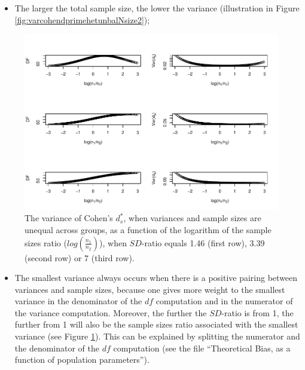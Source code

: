 \documentclass[
  english,
  man]{apa6}
\providecommand{\tightlist}{%
  \setlength{\itemsep}{0pt}\setlength{\parskip}{0pt}}
\begin{document}
\begin{itemize}
\tightlist
\item
  The larger the total sample size, the lower the variance (illustration in Figure \ref{fig:varcohendprimehetunbalNsize2});
\end{itemize}

\begin{figure}
\centering
\includegraphics{Theoretical-Variance-of-all-estimators-as-a-function-of-population-parameters_files/figure-latex/varcohendprimehetunbalnratiosdratio2-1.pdf}
\caption{\label{fig:varcohendprimehetunbalnratiosdratio2}The variance of Cohen's \(d^*_s\), when variances and sample sizes are unequal across groups, as a function of the logarithm of the sample sizes ratio (\(log \left( \frac{n_1}{n_2} \right)\)), when \(SD\)-ratio equals 1.46 (first row), 3.39 (second row) or 7 (third row).}
\end{figure}

\begin{itemize}
\tightlist
\item
  The smallest variance always occurs when there is a positive pairing between variances and sample sizes, because one gives more weight to the smallest variance in the denominator of the \(df\) computation and in the numerator of the variance computation. Moreover, the further the \(SD\)-ratio is from 1, the further from 1 will also be the sample sizes ratio associated with the smallest variance (see Figure \ref{fig:varcohendprimehetunbalnratiosdratio2}). This can be explained by splitting the numerator and the denominator of the \(df\) computation (see the file \enquote{Theoretical Bias, as a function of population parameters}).
\end{itemize}
\end{document}
